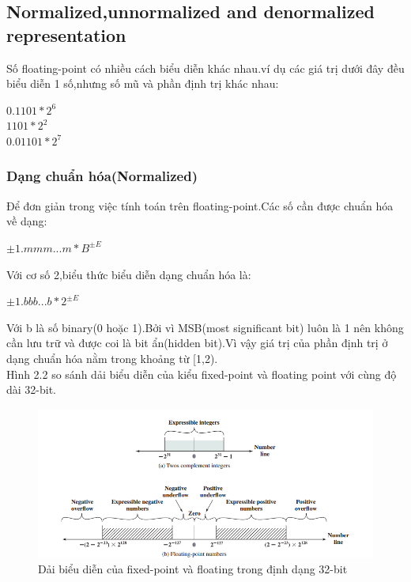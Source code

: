 \documentclass[11pt,a4paper,vietnamese]{report}
\begin{document}
\subsection{Normalized,unnormalized and denormalized representation}
Số floating-point có nhiều cách biểu diễn khác nhau.ví dụ các giá trị dưới đây đều biểu diễn 1 số,nhưng số mũ và phần định trị khác nhau:
\begin{center}
$0.1101*2^6$\\
$1101*2^2$\\
$0.01101*2^7$\\
\end{center}
\subsubsection{Dạng chuẩn hóa(Normalized)}
Để đơn giản trong việc tính toán trên floating-point.Các số cần được chuẩn hóa về dạng:
\begin{center}
$\pm{1.mmm...m}*B^{\pm{E}}$\\
\end{center}
Với cơ số 2,biểu thức biểu diễn dạng chuẩn hóa là:
\begin{center}
$\pm{1.bbb...b}*2^{\pm{E}}$\\
\end{center}
Với b là số binary(0 hoặc 1).Bởi vì MSB(most significant bit) luôn là 1 nên không cần lưu trữ và được coi là bit ẩn(hidden bit).Vì vậy giá trị của phần định trị ở dạng chuẩn hóa nằm trong khoảng từ [1,2).\\
Hình 2.2 so sánh dải biểu diễn của kiểu fixed-point và floating point với cùng độ dài 32-bit.
\begin{center}
    \begin{figure}[htp]
    \begin{center}
     \includegraphics[scale=.5]{image/fig2.png}
    \end{center}
    \caption{Dải biểu diễn của fixed-point và floating trong định dạng 32-bit}
    \label{reffig2.png}
    \end{figure}
\end{center}
\end{document}
